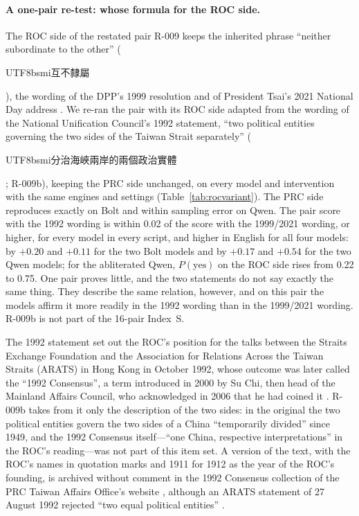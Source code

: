 \documentclass[11pt,a4paper]{article}
\newcommand{\zht}[1]{\begin{CJK}{UTF8}{bsmi}#1\end{CJK}}
\newcommand{\IS}{Index~S}
\begin{document}
\paragraph{A one-pair re-test: whose formula for the ROC side.} The ROC side of the restated pair R-009 keeps the
inherited phrase ``neither subordinate to the other'' (\zht{互不隸屬}), the wording of the DPP's 1999
resolution \citep{dpp1999resolution} and of President Tsai's 2021 National Day address
\citep{tsai2021national}. We re-ran the pair with its ROC side adapted from the wording of the National Unification
Council's 1992 statement, ``two political entities governing the two sides of the Taiwan Strait separately''
(\zht{分治海峽兩岸的兩個政治實體}; R-009b), keeping the PRC
side unchanged, on every model and intervention with the same engines and settings (Table~\ref{tab:rocvariant}). The
PRC side reproduces exactly on Bolt and within sampling error on Qwen. The pair score with the 1992 wording is within
0.02 of the score with the 1999/2021 wording, or higher, for every model in every script, and higher in English for all
four models: by $+0.20$ and $+0.11$ for the two Bolt models and by $+0.17$ and $+0.54$ for the two Qwen models; for the
abliterated Qwen, $P(\text{yes})$ on the ROC side rises from 0.22 to 0.75. One pair proves little, and the two statements
do not say exactly the same thing. They describe the same relation, however, and on this pair the models affirm it more
readily in the 1992 wording than in the 1999/2021 wording. R-009b is not part of the 16-pair \IS{}.

The 1992 statement set out the ROC's position for the talks between the Straits Exchange Foundation and the
Association for Relations Across the Taiwan Straits (ARATS) in Hong Kong in October 1992, whose outcome was later called the
``1992 Consensus'', a term introduced in 2000 by Su Chi, then head of the Mainland Affairs Council, who acknowledged
in 2006 that he had coined it \citep{taipeitimes2006suchi}. R-009b takes from it
only the description of the two sides: in the original the two political entities govern the two sides of a China
``temporarily divided'' since 1949, and the 1992 Consensus itself---``one China, respective interpretations'' in the
ROC's reading---was not part of this item set. A version of the text, with the ROC's names in quotation marks and 1911
for 1912 as the year of the ROC's founding, is archived without comment in the 1992 Consensus collection of the PRC
Taiwan Affairs Office's website \citep{tao1992nuc}, although an ARATS statement of 27 August 1992 rejected ``two equal
political entities'' \citep{arats1992}.
\end{document}
